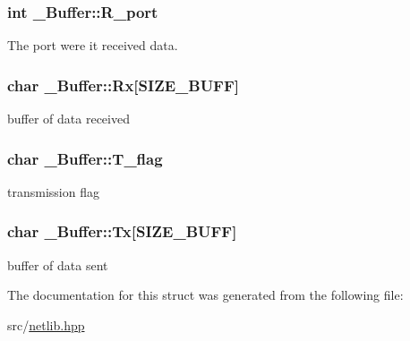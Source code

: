 \subsubsection[{\texorpdfstring{R\+\_\+port}{R_port}}]{\setlength{\rightskip}{0pt plus 5cm}int \+\_\+\+Buffer\+::\+R\+\_\+port}\hypertarget{struct___buffer_a7f498f79ab3e8c70f43d929bda912bfc}{}\label{struct___buffer_a7f498f79ab3e8c70f43d929bda912bfc}
The port were it received data. 
\subsubsection[{\texorpdfstring{Rx}{Rx}}]{\setlength{\rightskip}{0pt plus 5cm}char \+\_\+\+Buffer\+::\+Rx\mbox{[}{\bf S\+I\+Z\+E\+\_\+\+B\+U\+FF}\mbox{]}}\hypertarget{struct___buffer_a8c44c403d9e3f8ddefd09d410312375b}{}\label{struct___buffer_a8c44c403d9e3f8ddefd09d410312375b}
buffer of data received 
\subsubsection[{\texorpdfstring{T\+\_\+flag}{T_flag}}]{\setlength{\rightskip}{0pt plus 5cm}char \+\_\+\+Buffer\+::\+T\+\_\+flag}\hypertarget{struct___buffer_a458c1db99177167836af8505dea8bae3}{}\label{struct___buffer_a458c1db99177167836af8505dea8bae3}
transmission flag 
\subsubsection[{\texorpdfstring{Tx}{Tx}}]{\setlength{\rightskip}{0pt plus 5cm}char \+\_\+\+Buffer\+::\+Tx\mbox{[}{\bf S\+I\+Z\+E\+\_\+\+B\+U\+FF}\mbox{]}}\hypertarget{struct___buffer_a803fdcb8a3d9d6358bf64aa8b311cb80}{}\label{struct___buffer_a803fdcb8a3d9d6358bf64aa8b311cb80}
buffer of data sent 

The documentation for this struct was generated from the following file\+:\begin{DoxyCompactItemize}
\item 
src/\hyperlink{netlib_8hpp}{netlib.\+hpp}\end{DoxyCompactItemize}
